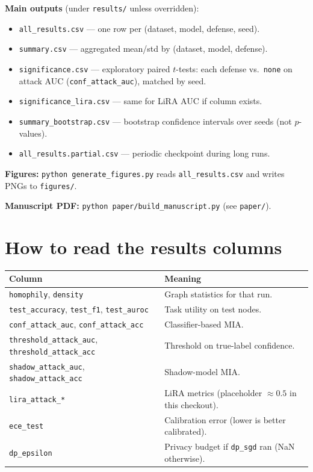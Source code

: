 \documentclass[11pt,a4paper]{article}
\begin{document}
\textbf{Main outputs} (under \texttt{results/} unless overridden):
\begin{itemize}
  \item \texttt{all\_results.csv} --- one row per (dataset, model, defense, seed).
  \item \texttt{summary.csv} --- aggregated mean/std by (dataset, model, defense).
  \item \texttt{significance.csv} --- exploratory paired $t$-tests: each defense vs.\ \texttt{none} on attack AUC (\texttt{conf\_attack\_auc}), matched by seed.
  \item \texttt{significance\_lira.csv} --- same for LiRA AUC if column exists.
  \item \texttt{summary\_bootstrap.csv} --- bootstrap confidence intervals over seeds (not $p$-values).
  \item \texttt{all\_results.partial.csv} --- periodic checkpoint during long runs.
\end{itemize}

\textbf{Figures:} \texttt{python generate\_figures.py} reads \texttt{all\_results.csv} and writes PNGs to \texttt{figures/}.

\textbf{Manuscript PDF:} \texttt{python paper/build\_manuscript.py} (see \texttt{paper/}).

\section{How to read the results columns}

\begin{table}[ht]
\centering
\footnotesize
\setlength{\tabcolsep}{4pt}
\begin{tabular}{@{}>{\raggedright\arraybackslash}p{}p{}@{}}
\toprule
\textbf{Column} & \textbf{Meaning} \\
\midrule
\texttt{homophily}, \texttt{density} & Graph statistics for that run. \\
\texttt{test\_accuracy}, \texttt{test\_f1}, \texttt{test\_auroc} & Task utility on test nodes. \\
\texttt{conf\_attack\_auc}, \texttt{conf\_attack\_acc} & Classifier-based MIA. \\
\texttt{threshold\_attack\_auc}, \texttt{threshold\_attack\_acc} & Threshold on true-label confidence. \\
\texttt{shadow\_attack\_auc}, \texttt{shadow\_attack\_acc} & Shadow-model MIA. \\
\texttt{lira\_attack\_*} & LiRA metrics (placeholder $\approx 0.5$ in this checkout). \\
\texttt{ece\_test} & Calibration error (lower is better calibrated). \\
\texttt{dp\_epsilon} & Privacy budget if \texttt{dp\_sgd} ran (NaN otherwise). \\
\bottomrule
\end{tabular}
\end{table}
\end{document}

